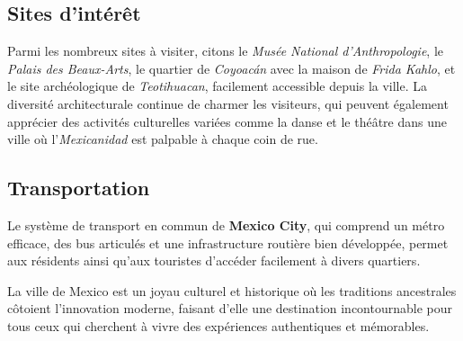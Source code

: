 \documentclass[12pt, a4paper]{article}
\begin{document}
\subsection*{\textbf{Sites d'intérêt}}

Parmi les nombreux sites à visiter, citons le \textit{Musée National d'Anthropologie}, le \textit{Palais des Beaux-Arts}, le quartier de \textit{Coyoacán} avec la maison de \textit{Frida Kahlo}, et le site archéologique de \textit{Teotihuacan}, facilement accessible depuis la ville.
La diversité architecturale continue de charmer les visiteurs, qui peuvent également apprécier des activités culturelles variées comme la danse et le théâtre dans une ville où l'\textit{Mexicanidad} est palpable à chaque coin de rue. \subsection*{\textbf{Transportation}} Le système de transport en commun de \textbf{Mexico City}, qui comprend un métro efficace, des bus articulés et une infrastructure routière bien développée, permet aux résidents ainsi qu'aux touristes d'accéder facilement à divers quartiers.

La ville de Mexico est un joyau culturel et historique où les traditions ancestrales côtoient l'innovation moderne, faisant d'elle une destination incontournable pour tous ceux qui cherchent à vivre des expériences authentiques et mémorables.
\end{document}
